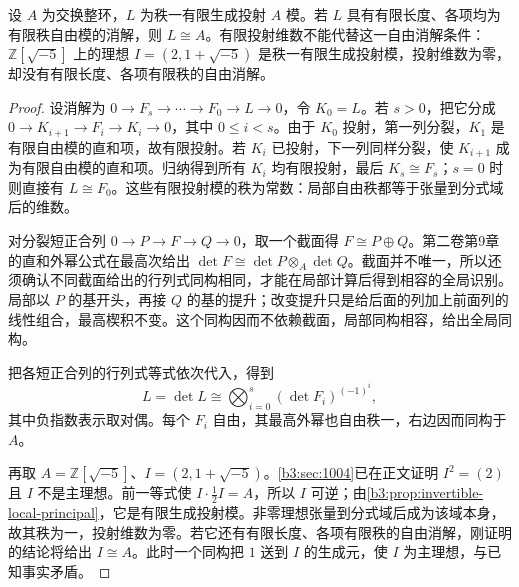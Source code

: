 \begin{lemma}\label{b3:lem:determinant-finite-free-resolution}
	设 \(A\) 为交换整环，\(L\) 为秩一有限生成投射 \(A\) 模。若 \(L\) 具有有限长度、各项均为有限秩自由模的消解，则 \(L\cong A\)。有限投射维数不能代替这一自由消解条件：\(\mathbb Z[\sqrt{-5}]\) 上的理想 \(I=(2,1+\sqrt{-5})\) 是秩一有限生成投射模，投射维数为零，却没有有限长度、各项有限秩的自由消解。
\end{lemma}
\begin{proof}
	设消解为 \(0\to F_s\to\cdots\to F_0\to L\to0\)，令 \(K_0=L\)。若 \(s>0\)，把它分成 \(0\to K_{i+1}\to F_i\to K_i\to0\)，其中 \(0\le i<s\)。由于 \(K_0\) 投射，第一列分裂，\(K_1\) 是有限自由模的直和项，故有限投射。若 \(K_i\) 已投射，下一列同样分裂，使 \(K_{i+1}\) 成为有限自由模的直和项。归纳得到所有 \(K_i\) 均有限投射，最后 \(K_s\cong F_s\)；\(s=0\) 时则直接有 \(L\cong F_0\)。这些有限投射模的秩为常数：局部自由秩都等于张量到分式域后的维数。

	对分裂短正合列 \(0\to P\to F\to Q\to0\)，取一个截面得 \(F\cong P\oplus Q\)。第二卷第9章的直和外幂公式在最高次给出 \(\det F\cong\det P\otimes_A\det Q\)。截面并不唯一，所以还须确认不同截面给出的行列式同构相同，才能在局部计算后得到相容的全局识别。局部以 \(P\) 的基开头，再接 \(Q\) 的基的提升；改变提升只是给后面的列加上前面列的线性组合，最高楔积不变。这个同构因而不依赖截面，局部同构相容，给出全局同构。

	把各短正合列的行列式等式依次代入，得到
	\[
		L=\det L\cong \bigotimes_{i=0}^s(\det F_i)^{(-1)^i},
	\]
	其中负指数表示取对偶。每个 \(F_i\) 自由，其最高外幂也自由秩一，右边因而同构于 \(A\)。

	再取 \(A=\mathbb Z[\sqrt{-5}]\)、\(I=(2,1+\sqrt{-5})\)。\cref{b3:sec:1004}已在正文证明 \(I^2=(2)\) 且 \(I\) 不是主理想。前一等式使 \(I\cdot\frac12I=A\)，所以 \(I\) 可逆；由\cref{b3:prop:invertible-local-principal}，它是有限生成投射模。非零理想张量到分式域后成为该域本身，故其秩为一，投射维数为零。若它还有有限长度、各项有限秩的自由消解，刚证明的结论将给出 \(I\cong A\)。此时一个同构把 \(1\) 送到 \(I\) 的生成元，使 \(I\) 为主理想，与已知事实矛盾。
\end{proof}

